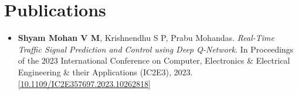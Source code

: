 \section*{Publications}
\begin{itemize}[leftmargin=0.5cm, label={}]

    \item \textbf{Shyam Mohan V M}, Krishnendhu S P, Prabu Mohandas. \textit{Real-Time Traffic Signal Prediction and Control using Deep Q-Network}. In Proceedings of the 2023 International Conference on Computer, Electronics \& Electrical Engineering \& their Applications (IC2E3), 2023.  
    \href{https://doi.org/10.1109/IC2E357697.2023.10262818}{[10.1109/IC2E357697.2023.10262818]}

\end{itemize}
